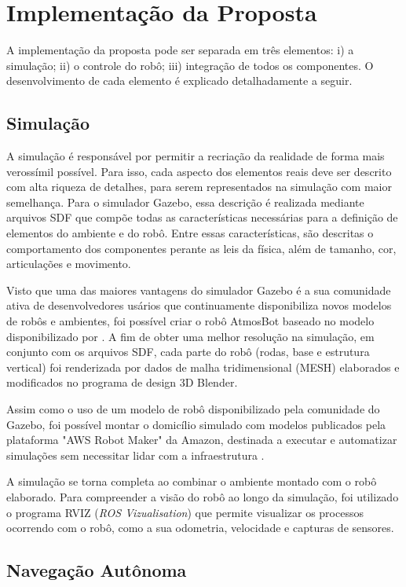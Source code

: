 \section{Implementação da Proposta}
A implementação da proposta pode ser separada em três elementos: i) a simulação; ii) o controle do robô; iii) integração de todos os componentes. O desenvolvimento de cada elemento é explicado detalhadamente a seguir.

\subsection{Simulação}
A simulação é responsável por permitir a recriação da realidade de forma mais verossímil possível. Para isso, cada aspecto dos elementos reais deve ser descrito com alta riqueza de detalhes, para serem representados na simulação com maior semelhança. Para o simulador Gazebo, essa descrição é realizada mediante arquivos SDF que compõe todas as características necessárias para a definição de elementos do ambiente e do robô. Entre essas características, são descritas o comportamento dos componentes perante as leis da física, além de tamanho, cor, articulações e movimento.

Visto que uma das maiores vantagens do simulador Gazebo é a sua comunidade ativa de desenvolvedores usários que continuamente disponibiliza novos modelos de robôs e ambientes, foi possível criar o robô AtmosBot baseado no modelo disponibilizado por \citet{modeloRobo}. A fim de obter uma melhor resolução na simulação, em conjunto com os arquivos SDF, cada parte do robô (rodas, base e estrutura vertical) foi renderizada por dados de malha tridimensional (MESH) elaborados e modificados no programa de design 3D Blender.

Assim como o uso de um modelo de robô disponibilizado pela comunidade do Gazebo, foi possível montar o domicílio simulado com modelos publicados pela plataforma "AWS Robot Maker" da Amazon, destinada a executar e automatizar simulações sem necessitar lidar com a infraestrutura \cite{aws, modeloAmbiente}.

A simulação se torna completa ao combinar o ambiente montado com o robô elaborado. Para compreender a visão do robô ao longo da simulação, foi utilizado o programa RVIZ (\textit{ROS Vizualisation}) que permite visualizar os processos ocorrendo com o robô, como a sua odometria, velocidade e capturas de sensores.

\subsection{Navegação Autônoma}

